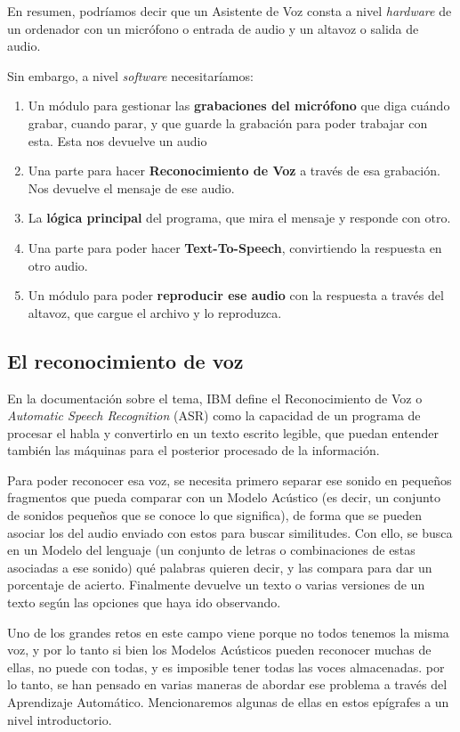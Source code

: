 En resumen, podríamos decir que un Asistente de Voz consta a nivel \textit{hardware} de un ordenador con un micrófono o entrada de audio y un altavoz o salida de audio.

Sin embargo, a nivel \textit{software} necesitaríamos:
\begin{enumerate}
	\item Un módulo para gestionar las \textbf{grabaciones del micrófono} que diga cuándo grabar, cuando parar, y que guarde la grabación para poder trabajar con esta. Esta nos devuelve un audio
	\item Una parte para hacer \textbf{Reconocimiento de Voz} a través de esa grabación. Nos devuelve el mensaje de ese audio.
	\item La \textbf{lógica principal} del programa, que mira el mensaje y responde con otro.
	\item Una parte para poder hacer \textbf{Text-To-Speech}, convirtiendo la respuesta en otro audio.
	\item Un módulo para poder \textbf{reproducir ese audio} con la respuesta a través del altavoz, que cargue el archivo y lo reproduzca.
\end{enumerate}

\subsection{El reconocimiento de voz}
En la documentación sobre el tema, IBM \cite{sr-definition} define el Reconocimiento de Voz o \textit{Automatic Speech Recognition} (ASR) como la capacidad de un programa de procesar el habla y convertirlo en un texto escrito legible, que puedan entender también las máquinas para el posterior procesado de la información.

Para poder reconocer esa voz, se necesita primero separar ese sonido en pequeños fragmentos que pueda comparar con un Modelo Acústico (es decir, un conjunto de sonidos pequeños que se conoce lo que significa), de forma que se pueden asociar los del audio enviado con estos para buscar similitudes. Con ello, se busca en un Modelo del lenguaje (un conjunto de letras o combinaciones de estas asociadas a ese sonido) qué palabras quieren decir, y las compara para dar un porcentaje de acierto. Finalmente devuelve un texto o varias versiones de un texto según las opciones que haya ido observando.

Uno de los grandes retos en este campo viene porque no todos tenemos la misma voz, y por lo tanto si bien los Modelos Acústicos pueden reconocer muchas de ellas, no puede con todas, y es imposible tener todas las voces almacenadas. por lo tanto, se han pensado en varias maneras de abordar ese problema a través del Aprendizaje Automático. Mencionaremos algunas de ellas en estos epígrafes a un nivel introductorio.

